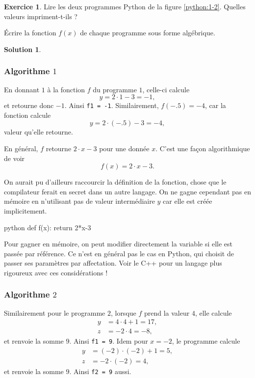 \documentclass[a4paper, 14pt]{extarticle}
\theoremstyle{plain}
\newtheorem*{sol}{Solution}
\theoremstyle{definition}
\newtheorem{ex}{Exercice}
\newif\ifsolutions
\newcommand{\exe}[2]{
		\begin{ex} #1  \end{ex}
		\begin{sol} #2 \end{sol}
	}
\newcommand{\exe}[2]{
		\begin{ex} #1  \end{ex}
	}
\begin{document}
	\exe{
		Lire les deux programmes Python de la figure \ref{python:1-2}.
		Quelles valeurs impriment-t-ils ?
		
		Écrire la fonction $f(x)$ de chaque programme sous forme algébrique.
	}{}{
	
	
	\ifsolutions
	
	\subsubsection*{Algorithme $1$}
	
		En donnant $1$ à la fonction $f$ du programme $1$, celle-ci calcule
			\[ y = 2\cdot 1 - 3 = -1, \]
		et retourne donc $-1$.
		Ainsi \texttt{f1 = -1}.
		Similairement, $f(-.5) = -4$, car la fonction calcule
			\[ y = 2 \cdot (-.5) - 3 = -4, \]
		valeur qu'elle retourne.
		
		En général, $f$ retourne $2\cdot x-3$ pour une donnée $x$.
		C'est une façon algorithmique de voir
			\[ f(x) = 2\cdot x - 3. \]
		
		On aurait pu d'ailleurs raccourcir la définition de la fonction, chose que le compilateur ferait en secret dans un autre langage.
		On ne gagne cependant pas en mémoire en n'utilisant pas de valeur intermédiaire $y$ car elle est créée implicitement.
\begin{mintedbox}{python}
def f(x):
    return 2*x-3
\end{mintedbox}
		Pour gagner en mémoire, on peut modifier directement la variable si elle est passée par référence. 
		Ce n'est en général pas le cas en Python, qui choisit de passer ses paramètres par affectation.
		Voir le C++ pour un langage plus rigoureux avec ces considérations !
	
	\subsubsection*{Algorithme $2$}
		
		Similairement pour le programme $2$, lorsque $f$ prend la valeur $4$, elle calcule
			\begin{align*}
				y &= 4\cdot4 + 1 = 17, \\
				z &= -2\cdot 4 = -8,
			\end{align*}
		et renvoie la somme $9$.
		Ainsi \texttt{f1 = 9}.
		Idem pour $x=-2$, le programme calcule
			\begin{align*}
				y &= (-2)\cdot(-2) + 1 = 5, \\
				z &= -2\cdot (-2) = 4,
			\end{align*}
		et renvoie la somme $9$. Ainsi \texttt{f2 = 9} aussi.
		
}
\end{document}
